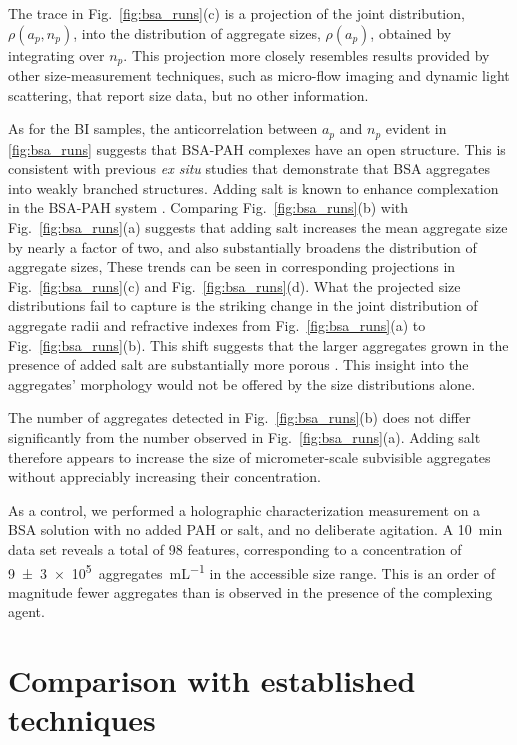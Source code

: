 The trace in Fig.~\ref{fig:bsa_runs}(c) is a projection of the
joint distribution, $\rho(a_p,n_p)$, into the distribution of
aggregate sizes, $\rho(a_p)$, obtained by integrating over $n_p$. 
This projection more closely resembles results
provided by other size-measurement techniques, such as micro-flow imaging 
and dynamic light scattering, that report size data, but no other information.

As for the BI samples, the anticorrelation between $a_p$ and $n_p$
evident in \ref{fig:bsa_runs} suggests that BSA-PAH complexes have
an open structure.  This is consistent with previous \emph{ex situ}
studies \cite{hagiwara96,siposova12} that demonstrate
that BSA aggregates into weakly branched structures.
Adding salt is known to enhance complexation \cite{ball02}
in the BSA-PAH system \cite{ball02}.
Comparing Fig.~\ref{fig:bsa_runs}(b) with Fig.~\ref{fig:bsa_runs}(a) 
suggests that adding salt  increases the mean aggregate size by nearly a factor of two,
and also substantially broadens the distribution of aggregate sizes,
These trends can be seen in corresponding projections in 
Fig.~\ref{fig:bsa_runs}(c) and Fig.~\ref{fig:bsa_runs}(d).
What the projected size distributions fail to capture is the striking change in the
joint distribution of aggregate radii and refractive indexes
from Fig.~\ref{fig:bsa_runs}(a) to Fig.~\ref{fig:bsa_runs}(b).
This shift suggests that the larger aggregates grown in the
presence of added salt are substantially more porous
\cite{cheong11}.  This insight into the aggregates'
morphology would not be offered by the
size distributions alone.

The number of aggregates detected in Fig.~\ref{fig:bsa_runs}(b) does not differ significantly from the number observed in Fig.~\ref{fig:bsa_runs}(a). Adding salt therefore appears to increase the size of micrometer-scale subvisible aggregates without appreciably increasing their concentration.

As a control, we performed a holographic characterization measurement on a BSA solution with no added PAH or salt, and no deliberate agitation. A \SI{10}{\minute} data set reveals a total of 98 features, corresponding to a concentration of \SI{9(3)e5}{aggregates\per\mL} in the accessible size range. This is an order of magnitude fewer aggregates than is observed in the presence of the complexing agent.

\section{Comparison with established techniques}

